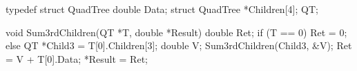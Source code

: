 \begin{cprog}
typedef struct QuadTree {
  double Data;
  struct QuadTree 
     *Children[4];
} QT;

void Sum3rdChildren(QT *T,
           double *Result) {
  double Ret;
  if (T == 0) { Ret = 0;
  } else {
    QT *Child3 =
      T[0].Children[3];
    double V;
    Sum3rdChildren(Child3, 
                   &V);
    Ret = V + T[0].Data;
  }
  *Result = Ret;
}
\end{cprog} 

